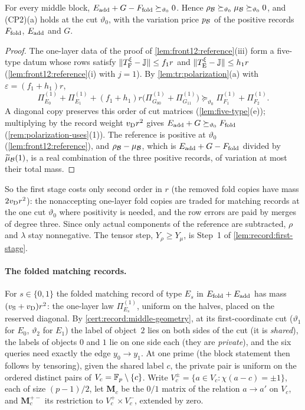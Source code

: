 \begin{lemma}\label{lem:middle-polarization}
For every middle block, $E_{\rm add}+G-F_{\rm fold}\succeq_{\vartheta_0}0$. Hence
$\rho_{\mathcal B}\succeq_{\vartheta_0}\mu_{\mathcal B}\succeq_{\vartheta_0}0$, and (CP2)(a)
holds at the cut $\vartheta_0$, with the variation price $p_{\mathcal B}$ of the
positive records $F_{\rm fold}$, $E_{\rm add}$ and $G$.
\end{lemma}

\begin{proof}
The one-layer data of the proof of \cref{lem:front12:reference}(iii) form a
five-type datum whose rows satisfy $\|T^\xi_{\rm F}-\mathbb J\|\le f_1r$ and
$\|T^\xi_{\rm E}-\mathbb J\|\le h_1r$ (\cref{lem:front12:reference}(i) with
$j=1$). By \cref{lem:tr:polarization}(a) with $\varepsilon=(f_1+h_1)r$,
\[
 \Pi^{(1)}_{E_0}+\Pi^{(1)}_{E_1}+(f_1+h_1)r\bigl(\Pi^{(1)}_{G_{00}}+\Pi^{(1)}_{G_{11}}\bigr)
 \succeq_{\vartheta_0}\Pi^{(1)}_{F_1}+\Pi^{(1)}_{F_2} .
\]
A diagonal copy preserves this order of cut matrices (\cref{lem:five-type}(e));
multiplying by the record weight $v_{\rm D}r^2$ gives
$E_{\rm add}+G\succeq_{\vartheta_0}F_{\rm fold}$ (\cref{rem:polarization-uses}(1)).
The reference is positive at $\vartheta_0$ (\cref{lem:front12:reference}), and
$\rho_{\mathcal B}-\mu_{\mathcal B}$, which is $E_{\rm add}+G-F_{\rm fold}$ divided by
$\widetilde\mu_{\mathcal B}(1)$, is a real combination of the three positive records,
of variation at most their total mass.
\end{proof}

So the first stage costs only second order in $r$ (the removed fold copies have mass $2v_{\rm D}r^2$): the nonaccepting
one-layer fold copies are traded for matching records at the one
cut $\vartheta_0$ where positivity is needed, and the row errors
are paid by merges of degree three.
Since only actual components of the reference are subtracted, $\rho$ and
$\lambda$ stay nonnegative. The tensor step, $Y_\rho\ge Y_\mu$, is Step~1 of
\cref{lem:record:first-stage}.

\paragraph{The folded matching records.}
For $s\in\{0,1\}$ the folded matching record of type $E_s$ in
$E_{\rm fold}+E_{\rm add}$ has mass $(v_{\rm S}+v_{\rm D})r^2$: the one-layer law
$\Pi^{(1)}_{E_s}$, uniform on the halves, placed on the reserved diagonal. By
\cref{cert:record:middle-geometry}, at its first-coordinate cut
($\vartheta_1$ for $E_0$, $\vartheta_2$ for $E_1$) the label of object~$2$ lies
on both sides of the cut (it is \emph{shared}), the labels of objects $0$
and $1$ lie on one side each (they are \emph{private}), and the six queries
need exactly the edge $y_0\to y_1$. At one prime (the block statement then follows by tensoring), given the shared label $c$, the private
pair is uniform on the ordered distinct pairs of $V_c=\mathbb F_p\setminus\{c\}$.
Write
$V_c^\pm=\{a\in V_c:\chi(a-c)=\pm1\}$, each of size $(p-1)/2$, let
$\mathbf M_c$ be the $0/1$ matrix of the relation $a\to a'$ on $V_c$, and
$\mathbf M_c^{+-}$ its restriction to $V_c^+\times V_c^-$, extended by zero.

